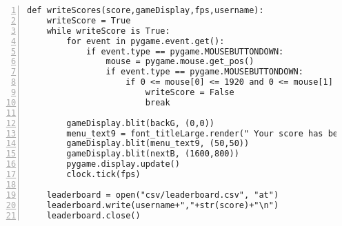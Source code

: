 \documentclass[12pt]{report}
\begin{document}
\begin{Verbatim}[numbers=left, frame=single]
def writeScores(score,gameDisplay,fps,username):
    writeScore = True
    while writeScore is True:
        for event in pygame.event.get():
            if event.type == pygame.MOUSEBUTTONDOWN:
                mouse = pygame.mouse.get_pos()
                if event.type == pygame.MOUSEBUTTONDOWN:
                    if 0 <= mouse[0] <= 1920 and 0 <= mouse[1] <= 1080:
                        writeScore = False
                        break
        
        gameDisplay.blit(backG, (0,0))
        menu_text9 = font_titleLarge.render(" Your score has been saved",True,white)
        gameDisplay.blit(menu_text9, (50,50))
        gameDisplay.blit(nextB, (1600,800))
        pygame.display.update()                                                                 
        clock.tick(fps)
    
    leaderboard = open("csv/leaderboard.csv", "at")
    leaderboard.write(username+","+str(score)+"\n")
    leaderboard.close()
\end{Verbatim}
\normalsize

\pagebreak
\end{document}
